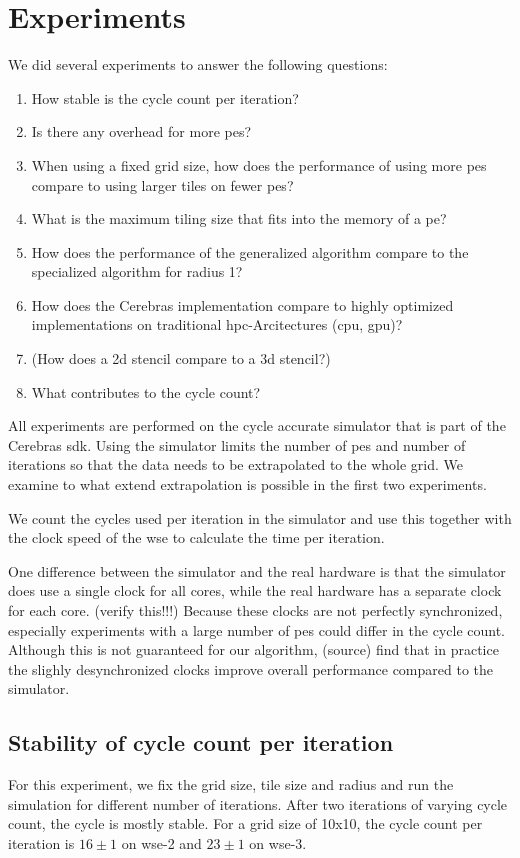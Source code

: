 \chapter{Experiments}
\label{sec:experiments}
We did several experiments to answer the following questions:
\begin{enumerate}
    \item How stable is the cycle count per iteration?
    \item Is there any overhead for more \acp{pe}?
    \item When using a fixed grid size, how does the performance of using more \acp{pe} compare to using larger tiles on fewer \acp{pe}?
    \item What is the maximum tiling size that fits into the memory of a \ac{pe}?
    \item How does the performance of the generalized algorithm compare to the specialized algorithm for radius 1?
    \item How does the Cerebras implementation compare to highly optimized implementations on traditional \ac{hpc}-Arcitectures (\ac{cpu}, \ac{gpu})?
    \item (How does a 2d stencil compare to a 3d stencil?)
    \item What contributes to the cycle count?
\end{enumerate}

All experiments are performed on the cycle accurate simulator that is part of the Cerebras \ac{sdk}.
Using the simulator limits the number of \acp{pe} and number of iterations so that the data needs to be extrapolated to the whole grid.
We examine to what extend extrapolation is possible in the first two experiments.

We count the cycles used per iteration in the simulator and use this together with the clock speed of the \ac{wse} to calculate the time per iteration.

One difference between the simulator and the real hardware is that the simulator does use a single clock for all cores, while the real hardware has a separate clock for each core. (verify this!!!) Because these clocks are not perfectly synchronized, especially experiments with a large number of \acp{pe} could differ in the cycle count. Although this is not guaranteed for our algorithm, (source) find that in practice the slighly desynchronized clocks improve overall performance compared to the simulator. 

\section{Stability of cycle count per iteration}
For this experiment, we fix the grid size, tile size and radius and run the simulation for different number of iterations.
After two iterations of varying cycle count, the cycle is mostly stable.
For a grid size of 10x10, the cycle count per iteration is $16\pm1$ on \ac{wse}-2 and $23\pm1$ on \ac{wse}-3.

